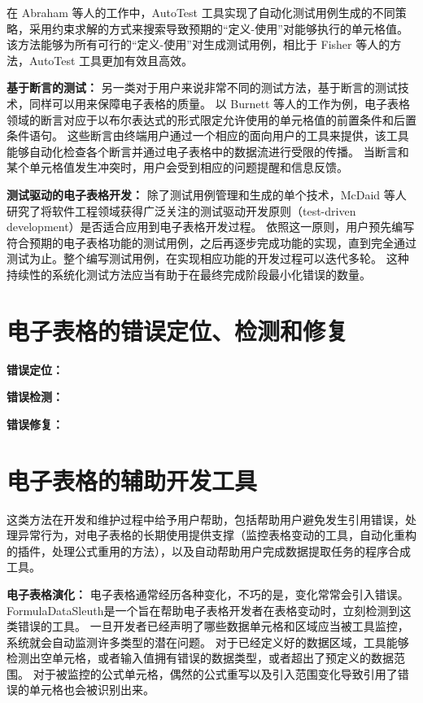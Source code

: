 在 Abraham 等人的工作\cite{abraham2006autotest}中，AutoTest 工具实现了自动化测试用例生成的不同策略，采用约束求解的方式来搜索导致预期的“定义-使用”对能够执行的单元格值。该方法能够为所有可行的“定义-使用”对生成测试用例，相比于 Fisher 等人的方法\cite{fisher2006integrating}，AutoTest 工具更加有效且高效。

\textbf{基于断言的测试：}
另一类对于用户来说非常不同的测试方法，基于断言的测试技术\cite{burnett2003end,wilson2003harnessing,beckwith2002reasoning}，同样可以用来保障电子表格的质量。
以 Burnett 等人的工作\cite{burnett2003end}为例，电子表格领域的断言对应于以布尔表达式的形式限定允许使用的单元格值的前置条件和后置条件语句。
这些断言由终端用户通过一个相应的面向用户的工具来提供，该工具能够自动化检查各个断言并通过电子表格中的数据流进行受限的传播。
当断言和某个单元格值发生冲突时，用户会受到相应的问题提醒和信息反馈。

\textbf{测试驱动的电子表格开发：}
除了测试用例管理和生成的单个技术，McDaid 等人\cite{mcdaid2008test}研究了将软件工程领域获得广泛关注的测试驱动开发原则（test-driven development）是否适合应用到电子表格开发过程。
依照这一原则，用户预先编写符合预期的电子表格功能的测试用例，之后再逐步完成功能的实现，直到完全通过测试为止。整个编写测试用例，在实现相应功能的开发过程可以迭代多轮。
这种持续性的系统化测试方法应当有助于在最终完成阶段最小化错误的数量。


\section{电子表格的错误定位、检测和修复}

\textbf{错误定位：}

\textbf{错误检测：}

\textbf{错误修复：}


\section{电子表格的辅助开发工具}

这类方法在开发和维护过程中给予用户帮助，包括帮助用户避免发生引用错误，处理异常行为，对电子表格的长期使用提供支撑（监控表格变动的工具，自动化重构的插件，处理公式重用的方法），以及自动帮助用户完成数据提取任务的程序合成工具。

\textbf{电子表格演化：}
电子表格通常经历各种变化，不巧的是，变化常常会引入错误。
FormulaDataSleuth\cite{bekenn2008reducing}是一个旨在帮助电子表格开发者在表格变动时，立刻检测到这类错误的工具。
一旦开发者已经声明了哪些数据单元格和区域应当被工具监控，系统就会自动监测许多类型的潜在问题。
对于已经定义好的数据区域，工具能够检测出空单元格，或者输入值拥有错误的数据类型，或者超出了预定义的数据范围。
对于被监控的公式单元格，偶然的公式重写以及引入范围变化导致引用了错误的单元格也会被识别出来。

